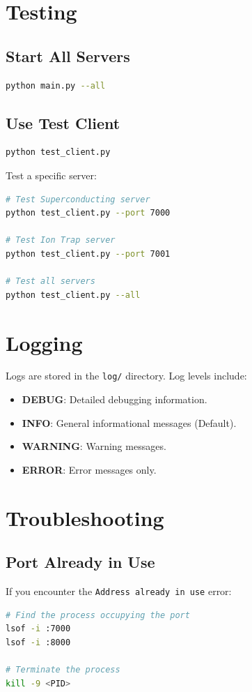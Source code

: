 \documentclass[UTF8, a4paper, 12pt]{article}
\begin{document}
\section{Testing}

\subsection{Start All Servers}
\begin{lstlisting}[language=bash]
python main.py --all
\end{lstlisting}

\subsection{Use Test Client}
\begin{lstlisting}[language=bash]
python test_client.py
\end{lstlisting}

Test a specific server:
\begin{lstlisting}[language=bash]
# Test Superconducting server
python test_client.py --port 7000

# Test Ion Trap server
python test_client.py --port 7001

# Test all servers
python test_client.py --all
\end{lstlisting}

\section{Logging}

Logs are stored in the \texttt{log/} directory. Log levels include:
\begin{itemize}
    \item \textbf{DEBUG}: Detailed debugging information.
    \item \textbf{INFO}: General informational messages (Default).
    \item \textbf{WARNING}: Warning messages.
    \item \textbf{ERROR}: Error messages only.
\end{itemize}

\section{Troubleshooting}

\subsection{Port Already in Use}
If you encounter the \texttt{Address already in use} error:
\begin{lstlisting}[language=bash]
# Find the process occupying the port
lsof -i :7000
lsof -i :8000

# Terminate the process
kill -9 <PID>
\end{lstlisting}
\end{document}
